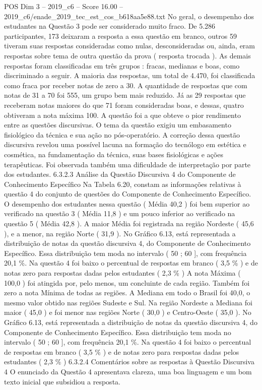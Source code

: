 \begin{textsample}{POS Dim 3 – 2019\_c6 – Score 16.00 – 2019\_c6/enade\_2019\_tec\_est\_cos\_b618aa5e88.txt}
No geral, o desempenho dos estudantes na Questão 3 pode ser considerado muito fraco.
De 5.286 participantes, 173 deixaram a resposta a essa questão em branco, outros 59 tiveram suas respostas consideradas como nulas, desconsideradas ou, ainda, eram respostas sobre tema de outra questão da prova ( resposta trocada ).
As demais respostas foram classificadas em três grupos : fracas, medianas e boas, como discriminado a seguir.
A maioria das respostas, um total de 4.470, foi classificada como fraca por receber notas de zero a 30.
A quantidade de respostas que com notas de 31 a 70 foi 555, um grupo bem mais reduzido.
Já as 29 respostas que receberam notas maiores do que 71 foram consideradas boas, e dessas, quatro obtiveram a nota máxima 100.
A questão foi a que obteve o pior rendimento entre as questões discursivas.
O tema da questão exigiu um embasamento fisiológico da técnica e sua ação no pós-operatório.
A correção dessa questão discursiva revelou uma possível lacuna na formação do tecnólogo em estética e cosmética, na fundamentação da técnica, suas bases fisiológicas e ações terapêuticas.
Foi observada também uma dificuldade de interpretação por parte dos estudantes. 6.3.2.3 Análise da Questão Discursiva 4 do Componente de Conhecimento Específico Na Tabela 6.20, constam as informações relativas à questão 4 do conjunto de questões do Componente de Conhecimento Específico.
O desempenho dos estudantes nessa questão ( Média 40,2 ) foi bem superior ao verificado na questão 3 ( Média 11,8 ) e um pouco inferior ao verificado na questão 5 ( Média 42,8 ).
A maior Média foi registrada na região Nordeste ( 45,6 ), e a menor, na região Norte ( 31,9 ).
No Gráfico 6.13, está representada a distribuição de notas da questão discursiva 4, do Componente de Conhecimento Específico.
Essa distribuição tem moda no intervalo ( 50 ; 60 ], com frequência 20,1 \%.
Na questão 4 foi baixo o percentual de respostas em branco ( 3,5 \% ) e de notas zero para respostas dadas pelos estudantes ( 2,3 \% ) A nota Máxima ( 100,0 ) foi atingida por, pelo menos, um concluinte de cada região.
Também foi zero a nota Mínima de todas as regiões.
A Mediana em todo o Brasil foi 40,0, o mesmo valor obtido nas regiões Sudeste e Sul.
Na região Nordeste a Mediana foi maior ( 45,0 ) e foi menor nas regiões Norte ( 30,0 ) e Centro-Oeste ( 35,0 ).
No Gráfico 6.13, está representada a distribuição de notas da questão discursiva 4, do Componente de Conhecimento Específico.
Essa distribuição tem moda no intervalo ( 50 ; 60 ], com frequência 20,1 \%.
Na questão 4 foi baixo o percentual de respostas em branco ( 3,5 \% ) e de notas zero para respostas dadas pelos estudantes ( 2,3 \% ) 6.3.2.4 Comentários sobre as respostas à Questão Discursiva 4 O enunciado da Questão 4 apresentava clareza, uma boa linguagem e um bom texto inicial que subsidiou a resposta.

\end{textsample}
